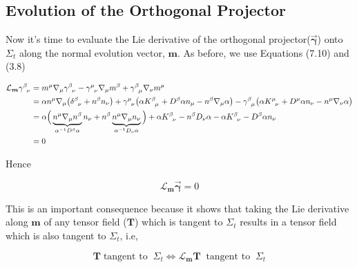 \documentclass[12pt]{article}
\renewcommand{\vec}[1]{\bm{#1}}
\numberwithin{equation}{section}
\numberwithin{theorem}{subsection}
\begin{document}
\subsection{Evolution of the Orthogonal Projector}

Now it's time to evaluate the Lie derivative of the orthogonal projector($\overrightarrow{\vec{\gamma}}$) onto $\Sigma_{t}$ along the normal evolution vector, $\vec{m}$. As before, we use Equations (7.10) and (3.8)

\begin{align*}

        \mathcal{L}_{\vec{m}} \tensor{\gamma}{^\beta_\nu} &= m^{\mu}\nabla_{\mu}\tensor{\gamma}{^\beta_\nu}-\tensor{\gamma}{^\mu_\nu}\nabla_{\mu}m^{\beta} + \tensor{\gamma}{^\beta_\mu}\nabla_{\nu}m^{\mu} \\

    &= \alpha n^{\mu} \nabla_{\mu} \big(\tensor{\delta}{^\beta_\nu} + n^{\beta}n_{\nu} \big) + \tensor{\gamma}{^\mu_\nu} \big( \alpha \tensor{K}{^\beta_\mu} + D^{\beta}\alpha n_{\mu} - n^{\beta} \nabla_{\mu}\alpha \big) -\tensor{\gamma}{^\beta_\mu} \big(\alpha\tensor{K}{^\mu_\nu} + D^{\mu}\alpha n_{\nu} -n^{\mu}\nabla_{\nu}\alpha \big) \\

&= \alpha \Big(\underbrace{n^{\mu}\nabla_{\mu}n^{\beta}}_{\alpha^{-1}D^{\beta}\alpha} n_{\nu} + n^{\beta} \underbrace{n^{\mu}\nabla_{\mu}n_{\nu}}_{\alpha^{-1}D_{\nu}\alpha} \Big) + \alpha\tensor{K}{^\beta_\nu} - n^{\beta}D_{\nu}\alpha -\alpha\tensor{K}{^\beta_\nu} - D^{\beta}\alpha n_{\nu} \\ 

&= 0

\end{align*}

Hence

\begin{equation}

    \boxed{\mathcal{L}_{\vec{m}}\overrightarrow{\vec{\gamma}} = 0}

\end{equation}

This is an important consequence because it shows that taking the Lie derivative along $\vec{m}$ of any tensor field ($\vec{T}$) which is tangent to $\Sigma_{t}$ results in a tensor field which is also tangent to $\Sigma_{t}$, i.e, 

\begin{equation}

    \boxed{\vec{T}  \; \mbox{tangent to} \; \;  \Sigma_{t} \Leftrightarrow \mathcal{L}_{\vec{m}}\vec{T} \; \;  \mbox{tangent to} \; \; \Sigma_{t}}

\end{equation}
\end{document}
